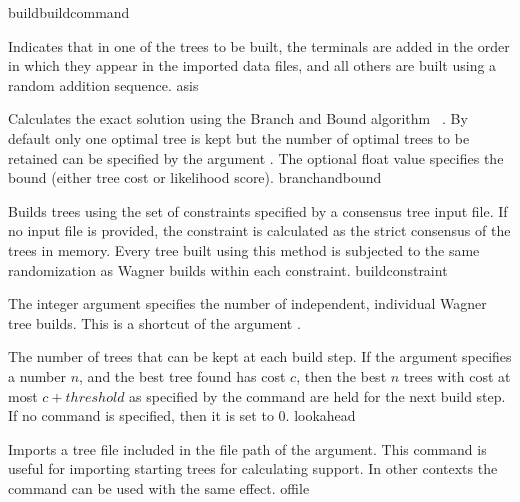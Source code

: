 \begin{command}{build}{buildcommand}
\begin{arguments}
            {Indicates that in one of the trees to be built, the terminals are
            added in the order in which they appear in the imported data files,
            and all others are built using a random addition sequence.}
            {asis}

            {Calculates the exact solution using the Branch and Bound algorithm
            ~\cite{hendy1982}. By default only one optimal tree is kept but
            the number of optimal trees to be retained can be specified by the
            argument . The optional float value specifies the
            bound (either tree cost or likelihood score).}
            {branchandbound} 

            {Builds trees using the set of constraints specified by a consensus
            tree input file. If no input file is provided, the constraint is calculated as
            the strict consensus of the trees in memory. Every tree built
            using this method is subjected to the same randomization as Wagner
            builds within each constraint.}
            {buildconstraint}

            {The integer argument specifies the number of independent, individual
            Wagner tree builds. This is a shortcut of the argument .}
            {}

            {The number of trees that can be kept at each build step. If the
             argument 
            specifies a number $n$, and the best tree found has cost $c$, then the best $n$
            trees with cost at most $c + threshold$ as specified by
            the  command are held for the
            next build step. If no  command is specified,
            then it is set to $0$.}
            {lookahead}

            {Imports a tree file included in the file path of the argument. This command is
            useful for importing starting trees for calculating  support.
            In other contexts the command  can be used with the same effect.}
            {offile}


\end{arguments}
\end{command}
